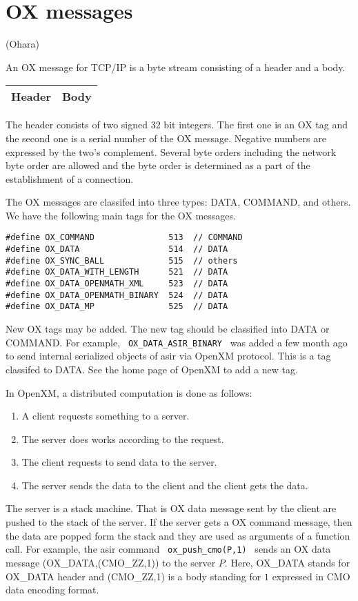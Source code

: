 
\section{OX messages}  (Ohara)

An OX message for TCP/IP is a byte stream consisting of
a header and a body.
\begin{center}
\begin{tabular}{|c|c|}
\hline
Header	& \hspace{10mm} Body \hspace{10mm} \\
\hline
\end{tabular}
\end{center}
The header consists of two signed 32 bit integers.
The first one is an OX tag 
and the second one is a serial number of the OX message.
Negative numbers are expressed by the two's complement.
Several byte orders including the network byte order
are allowed and the byte order is determined as a part of
the establishment of a connection.

The OX messages are classifed into three types:
DATA, COMMAND, and others.
We have the following main tags for the OX messages.
\begin{verbatim}
#define	OX_COMMAND               513  // COMMAND
#define	OX_DATA	                 514  // DATA
#define OX_SYNC_BALL             515  // others
#define OX_DATA_WITH_LENGTH      521  // DATA
#define OX_DATA_OPENMATH_XML     523  // DATA
#define OX_DATA_OPENMATH_BINARY  524  // DATA
#define OX_DATA_MP               525  // DATA
\end{verbatim}

New OX tags may be added.
The new tag should be classified into DATA or COMMAND.
For example, \verb+ OX_DATA_ASIR_BINARY +  was added a few month ago
to send internal serialized objects of asir via OpenXM protocol.
This is a tag classifed to DATA.
See the home page of OpenXM to add a new tag.

In OpenXM, a distributed computation is done as follows:
\begin{enumerate}
\item A client requests something to a server.
\item The server does works according to the request.
\item The client requests to send data to the server.
\item The server sends the data to the client and the client gets the data.
\end{enumerate}
The server is a stack machine. 
That is OX data message sent by the client
are pushed to the stack of the server. 
If the server gets a OX command message, then the data are
popped form the stack and they are used as arguments of a function call.
For example, the asir command
\verb+ ox_push_cmo(P,1) +
sends an OX data message
(OX\_DATA,(CMO\_ZZ,1)) to the server $P$.
Here,
OX\_DATA stands for OX\_DATA header and 
(CMO\_ZZ,1) is a body standing for $1$ expressed in CMO data encoding format.





